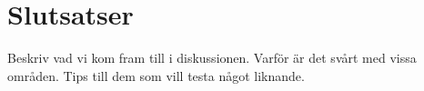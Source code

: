 
\chapter{Slutsatser}

\begin{binge}
Beskriv vad vi kom fram till i diskussionen.
Varför är det svårt med vissa områden. Tips till dem som vill testa något
liknande.  
\end{binge}
